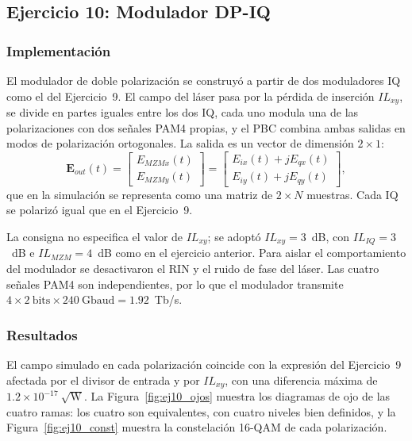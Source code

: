 \subsection*{Ejercicio 10: Modulador DP-IQ}

\subsubsection*{Implementación}

El modulador de doble polarización se construyó a partir de dos
moduladores IQ como el del Ejercicio~9. El campo del láser pasa por la
pérdida de inserción $IL_{xy}$, se divide en partes iguales entre los dos
IQ, cada uno modula una de las polarizaciones con dos señales PAM4 propias,
y el PBC combina ambas salidas en modos de polarización ortogonales. La
salida es un vector de dimensión $2\times1$:
%
\begin{equation}
\mathbf{E}_{out}(t) =
\begin{bmatrix} E_{MZMx}(t) \\ E_{MZMy}(t) \end{bmatrix} =
\begin{bmatrix} E_{ix}(t) + jE_{qx}(t) \\ E_{iy}(t) + jE_{qy}(t) \end{bmatrix},
\end{equation}
%
que en la simulación se representa como una matriz de $2 \times N$
muestras. Cada IQ se polarizó igual que en el Ejercicio~9.

La consigna no especifica el valor de $IL_{xy}$; se adoptó
$IL_{xy} = 3$~dB, con $IL_{IQ} = 3$~dB e $IL_{MZM} = 4$~dB como en el
ejercicio anterior. Para aislar el comportamiento del modulador se
desactivaron el RIN y el ruido de fase del láser. Las cuatro señales PAM4
son independientes, por lo que el modulador transmite
$4 \times 2~\text{bits} \times 240~\text{Gbaud} = 1.92$~Tb/s.

\subsubsection*{Resultados}

El campo simulado en cada polarización coincide con la expresión del
Ejercicio~9 afectada por el divisor de entrada y por $IL_{xy}$, con una
diferencia máxima de $1.2\times10^{-17}~\sqrt{\text{W}}$. La
Figura~\ref{fig:ej10_ojos} muestra los diagramas de ojo de las cuatro
ramas: los cuatro son equivalentes, con cuatro niveles bien definidos, y
la Figura~\ref{fig:ej10_const} muestra la constelación 16-QAM de cada
polarización.

